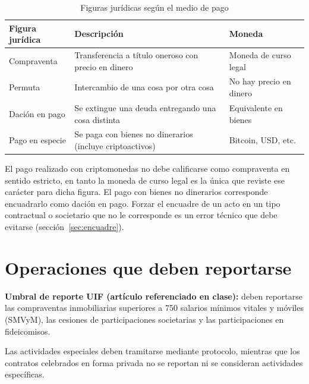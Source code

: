 \documentclass[12pt,oneside]{book}
\begin{document}
\begin{table}[H]
\centering
\caption{Figuras jurídicas según el medio de pago}
\renewcommand{\arraystretch}{1.2}
\begin{tabularx}{\textwidth}{>{\raggedright\arraybackslash}X>{\raggedright\arraybackslash}X>{\raggedright\arraybackslash}X}
\toprule
\textbf{Figura jurídica} & \textbf{Descripción} & \textbf{Moneda} \\
\midrule
Compraventa & Transferencia a título oneroso con precio en dinero & Moneda de curso legal \\
Permuta & Intercambio de una cosa por otra cosa & No hay precio en dinero \\
Dación en pago & Se extingue una deuda entregando una cosa distinta & Equivalente en bienes \\
Pago en especie & Se paga con bienes no dinerarios (incluye criptoactivos) & Bitcoin, USD, etc. \\
\bottomrule
\end{tabularx}
\end{table}

\begin{important}
El pago realizado con criptomonedas no debe calificarse como compraventa en sentido estricto, en tanto la moneda de curso legal es la única que reviste ese carácter para dicha figura. El pago con bienes no dinerarios corresponde encuadrarlo como dación en pago. Forzar el encuadre de un acto en un tipo contractual o societario que no le corresponde es un error técnico que debe evitarse (sección~\ref{sec:encuadre}).
\end{important}

\section{Operaciones que deben reportarse}

\begin{important}
\textbf{Umbral de reporte UIF (artículo referenciado en clase):} deben reportarse las compraventas inmobiliarias superiores a 750 salarios mínimos vitales y móviles (SMVyM), las cesiones de participaciones societarias y las participaciones en fideicomisos.
\end{important}

Las actividades especiales deben tramitarse mediante protocolo, mientras que los contratos celebrados en forma privada no se reportan ni se consideran actividades específicas.
\end{document}
